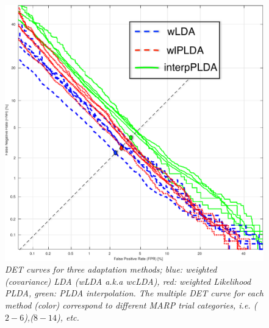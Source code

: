 \documentclass[a4paper]{article}
\begin{document}
\begin{figure}[h!]
\centering
\includegraphics[width=\linewidth]{figures/compare_adaptation_methodsv2-crop-crop}
\caption{{\it DET curves for three adaptation methods; blue: weighted (covariance) LDA (wLDA a.k.a wcLDA), red: weighted Likelihood PLDA, green: PLDA interpolation. The multiple DET curve for each method (color) correspond to different MARP trial categories, i.e. ($2-6$),($8-14$), etc.}}
\label{fig:det_curves}
\vspace{-5mm}
\end{figure}
\end{document}
